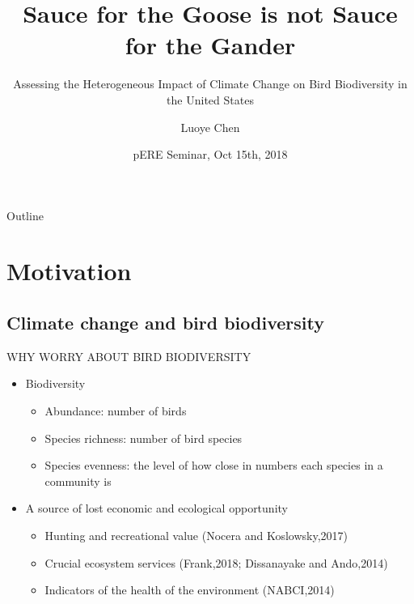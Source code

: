 \documentclass{beamer}
\title[Sauce for the Goose is not Sauce for the Gander] %
{Sauce for the Goose is not Sauce for the Gander}
\subtitle
{Assessing the Heterogeneous Impact of Climate Change on Bird Biodiversity in the United States}
\author[Luoye Chen] %
{Luoye Chen\inst{1}}
\institute[UIUC-ACE] %
{
  \inst{1}%
  Department of Agricultural and Consumer Economics\\
  University of Illinois
}
\date[CFP 2003] %
{pERE Seminar, Oct 15th, 2018}
\begin{document}
\begin{frame}
  \titlepage
\end{frame}

\begin{frame}{Outline}
  \tableofcontents
\end{frame}





\section{Motivation}

\subsection{Climate change and bird biodiversity}

\begin{frame}{WHY WORRY ABOUT BIRD BIODIVERSITY}{}

  \begin{itemize}
  \item
    Biodiversity
    \begin{itemize}
      \item Abundance: number of birds
      \item Species richness: number of bird species
      \item Species evenness: the level of how close in numbers each species in a community is
    \end{itemize}
  \item
   A source of lost economic and ecological opportunity
    \begin{itemize}
      \item Hunting and recreational value (Nocera and Koslowsky,2017)
      \item Crucial ecosystem services (Frank,2018; Dissanayake and Ando,2014)
      \item Indicators of the health of the environment (NABCI,2014)
    \end{itemize}

  \end{itemize}
\end{frame}
\end{document}

